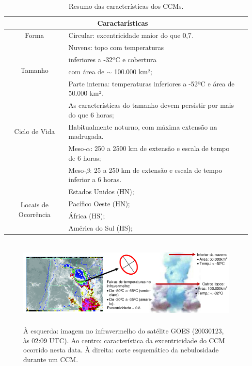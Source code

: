 \begin{table}
\caption{Resumo das características dos CCMs.}
\label{tab03}
\centering
\begin{tabular}{c|p{12cm}l}
\hline
\multicolumn{2}{c}{Caractarísticas}                                                 \\
\hline
Forma                                       & Circular: excentricidade maior do que 0,7.\\
\hline
\multirow{4}{2cm}{Tamanho}                  & Nuvens: topo com temperaturas \\
                                            & inferiores a -32ºC e cobertura \\
                                            & com área de $\sim$ 100.000 km²; \\
                                            & Parte interna: temperaturas inferiores a -52ºC e área de 50.000 km².         \\
\hline
\multirow{3}{2cm}{Ciclo de Vida}            & As características do tamanho devem persistir por mais do que 6 horas;   \\
                                            & Habitualmente noturno, com máxima extensão na madrugada.                \\
\hline
\multirow{3}{2cm}{Escala}                   & Meso-$\alpha$: 250 a 2500 km de extensão e escala de tempo de 6 horas;      \\
                                            & Meso-$\beta$: 25 a 250 km de extensão e escala de tempo inferior a 6 horas. \\
\hline
\multirow{4}{2cm}{Locais de Ocorrência} & Estados Unidos (HN);                  \\
                                            & Pacífico Oeste (HN);              \\
                                            & África (HS);                      \\
                                            & América do Sul (HS);              \\
\hline
\end{tabular}
\end{table}

\begin{figure}
\centering
\includegraphics[height=4.5cm]{./figs/fig08.png}
\caption{À esquerda: imagem no infravermelho do satélite GOES (20030123, às 02:09 UTC). Ao centro: característica da excentricidade do CCM ocorrido nesta data. À direita: corte esquemático da nebulosidade durante um CCM.}
\label{fig08}
\end{figure}


